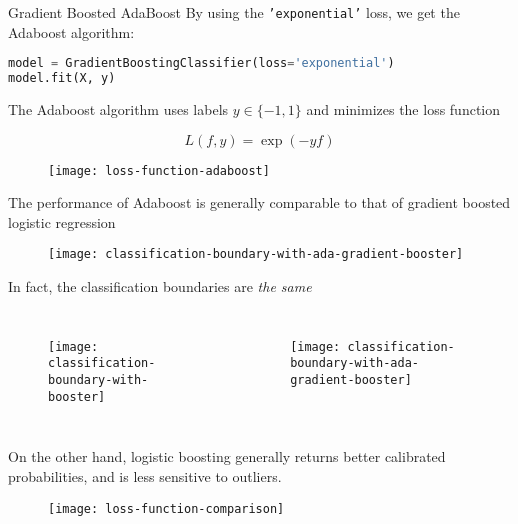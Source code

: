 %
\begin{frame}[fragile]{Gradient Boosted AdaBoost}
By using the \texttt{'exponential'} loss, we get the Adaboost algorithm:

\begin{lstlisting}[language=python]
model = GradientBoostingClassifier(loss='exponential')
model.fit(X, y)
\end{lstlisting}

\end{frame}
%
\begin{frame}
The Adaboost algorithm uses labels $y \in \{-1, 1\}$ and minimizes the loss function

$$ L(f, y) = \exp( - y f) $$

  \begin{figure}
    \texttt{[image: loss-function-adaboost]}
  \end{figure}

\end{frame}
%
\begin{frame}
The performance of Adaboost is generally comparable to that of gradient boosted logistic regression

  \begin{figure}
  
    \texttt{[image: classification-boundary-with-ada-gradient-booster]}
  \end{figure}
  
\end{frame}
%
\begin{frame}
In fact, the classification boundaries are \textit{the same}

  \begin{columns}
    \begin{figure}
      \texttt{[image: classification-boundary-with-booster]}
    \end{figure}
    \begin{figure}
      \texttt{[image: classification-boundary-with-ada-gradient-booster]}
    \end{figure}
  \end{columns}
  
\end{frame}
%
\begin{frame}
On the other hand, logistic boosting generally returns better calibrated probabilities, and is less sensitive to outliers.

  \begin{figure}
    \texttt{[image: loss-function-comparison]}
  \end{figure}
  
\end{frame}

